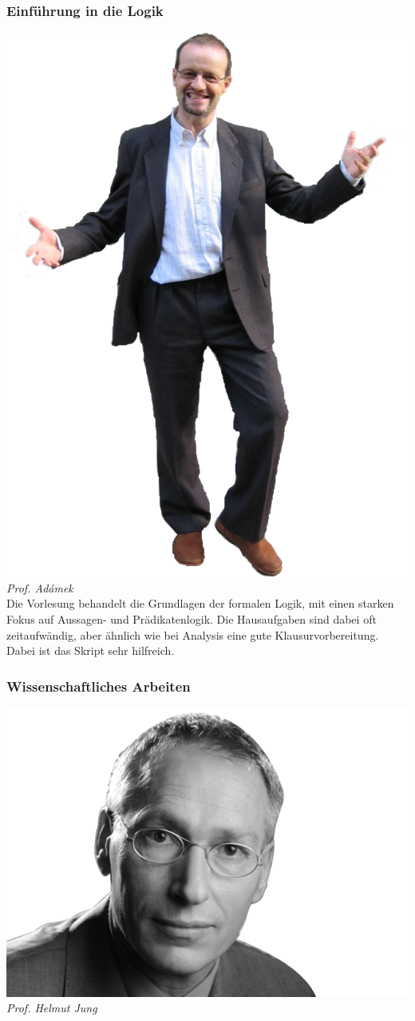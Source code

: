 \subsubsection{Einführung in die Logik}%
\includegraphics[width=0.8\linewidth]{bilder/dozenten/adamek.png}\\
\textit{Prof.  Adámek}\\
Die Vorlesung behandelt die Grundlagen der formalen Logik, mit einen
starken Fokus auf Aussagen- und Prädikatenlogik. Die Hausaufgaben sind
dabei oft zeitaufwändig, aber ähnlich wie bei Analysis eine gute
Klausurvorbereitung. Dabei ist das Skript sehr hilfreich.
\subsubsection{Wissenschaftliches Arbeiten}

\includegraphics[width=0.9\linewidth]{bilder/dozenten/jung_frei.png}\\
\textit{Prof. Helmut Jung}


